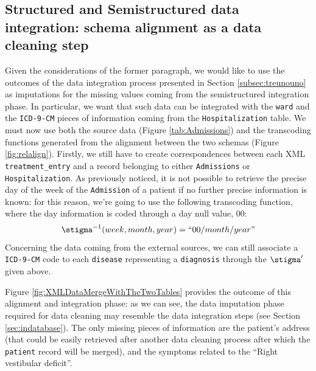\subsection{Structured and Semistructured data integration: schema alignment as a data cleaning step}\label{subsec:datacleaningintegrate}
Given the considerations of the former paragraph, we would like to use the outcomes of the data integration process presented in Section \ref{subsec:treunouno} as imputations for 
the missing values coming from the semistructured  integration phase. In particular, we want that such data can be integrated with the \texttt{ward} and the \texttt{ICD-9-CM} pieces of information coming from the \texttt{Hospitalization} table.
We must now use both the source data (Figure \vref{tab:Admissions}) and the transcoding functions generated from the alignment between the two schemas (Figure \vref{fig:relalign}). Firstly, we still have to create correspondences between each XML \texttt{treatment\_entry} and a record belonging to either \texttt{Admissions} or \texttt{Hospitalization}. 
As previously noticed, it is not possible to retrieve the precise day of the week of the \texttt{Admission} of a patient if no further precise information is known: for this reason, we're going to use the following transcoding function, where the day information is coded through a day null value, $00$:
\begin{equation*}
\transcoding^{-1}(week,month,year)=\textup{``}00/month/year\textup{''}
\end{equation*}
Concerning the data coming from the external sources, we can still associate  a \texttt{ICD-9-CM} code to each \texttt{disease} representing a \texttt{diagnosis} through the  $\transcoding'$ given above.

Figure \ref{fig:XMLDataMergeWithTheTwoTables} provides the outcome of this alignment and integration phase: as we can see, the data imputation phase required for data cleaning may resemble the data integration steps (see Section \ref{sec:indatabase}). The only missing pieces of information are the patient's address (that could be easily retrieved after another data cleaning process after which the \texttt{patient} record will be merged), and the symptoms related to the ``Right vestibular deficit''. 

